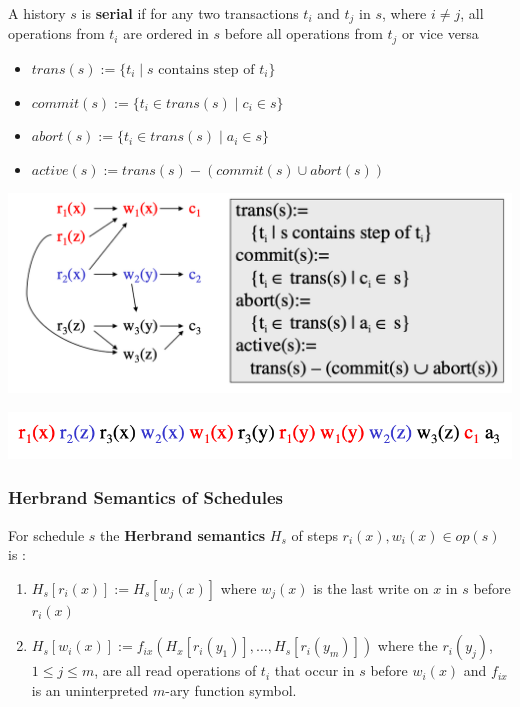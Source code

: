 \documentclass[11pt]{article}
\begin{document}
\begin{definition}[]
A history \(s\) is \textbf{serial} if for any two transactions \(t_i\) and \(t_j\) in \(s\),
where \(i\neq j\), all operations from \(t_i\) are ordered in \(s\) before all operations
from \(t_j\) or vice versa
\end{definition}

\begin{definition}[]
\begin{itemize}
\item \(trans(s):=\{t_i\mid s\text{ contains step of }t_i\}\)
\item \(commit(s):=\{t_i\in trans(s)\mid c_i\in s\}\)
\item \(abort(s):=\{t_i\in trans(s)\mid a_i\in s\}\)
\item \(active(s):=trans(s)-(commit(s)\cup abort(s))\)
\end{itemize}
\end{definition}


\begin{center}
\includegraphics[width=.8\textwidth]{../images/bigdatabase/6.png}
\label{}
\end{center}

\begin{center}
\includegraphics[width=.8\textwidth]{../images/bigdatabase/5.png}
\label{}
\end{center}
\subsubsection{Herbrand Semantics of Schedules}
\label{sec:orgd41dd2d}
\begin{definition}
For schedule \(s\) the \textbf{Herbrand semantics} \(H_s\) of steps \(r_i(x),w_i(x)\in op(s)\) is :
\begin{enumerate}
\item \(H_s[r_i(x)]:=H_s[w_j(x)]\) where \(w_j(x)\) is the last write on \(x\) in \(s\)
before \(r_i(x)\)
\item \(H_s[w_i(x)]:=f_{ix}(H_x[r_i(y_1)],\dots,H_s[r_i(y_m)])\) where
the \(r_i(y_j)\), \(1\le j\le m\), are all read operations of \(t_i\) that occur in \(s\)
before \(w_i(x)\) and \(f_{ix}\) is an uninterpreted \(m\)-ary function symbol.
\end{enumerate}
\end{definition}
\end{document}
